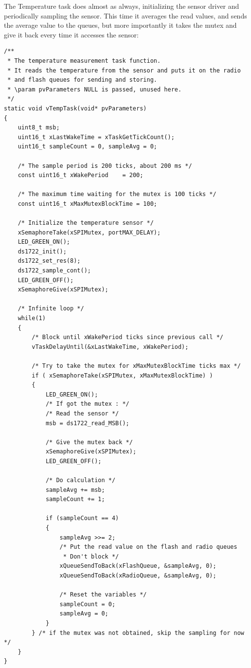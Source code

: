 \documentclass[11pt]{report}
\begin{document}
The Temperature task does almost as always, initializing the sensor driver and periodically sampling the sensor. This time it averages the read values, and sends the average value to the queues, but more importantly it takes the mutex and give it back every time it accesses the sensor:

\begin{verbatim}
/**
 * The temperature measurement task function.
 * It reads the temperature from the sensor and puts it on the radio
 * and flash queues for sending and storing.
 * \param pvParameters NULL is passed, unused here.
 */
static void vTempTask(void* pvParameters)
{
    uint8_t msb;
    uint16_t xLastWakeTime = xTaskGetTickCount();
    uint16_t sampleCount = 0, sampleAvg = 0;
    
    /* The sample period is 200 ticks, about 200 ms */
    const uint16_t xWakePeriod    = 200;
    
    /* The maximum time waiting for the mutex is 100 ticks */
    const uint16_t xMaxMutexBlockTime = 100;
    
    /* Initialize the temperature sensor */
    xSemaphoreTake(xSPIMutex, portMAX_DELAY);
    LED_GREEN_ON();
    ds1722_init();
    ds1722_set_res(8);
    ds1722_sample_cont();
    LED_GREEN_OFF();
    xSemaphoreGive(xSPIMutex);
    
    /* Infinite loop */
    while(1)
    {
        /* Block until xWakePeriod ticks since previous call */
        vTaskDelayUntil(&xLastWakeTime, xWakePeriod);
        
        /* Try to take the mutex for xMaxMutexBlockTime ticks max */
        if ( xSemaphoreTake(xSPIMutex, xMaxMutexBlockTime) )
        {
            LED_GREEN_ON();
            /* If got the mutex : */
            /* Read the sensor */
            msb = ds1722_read_MSB();
            
            /* Give the mutex back */
            xSemaphoreGive(xSPIMutex);
            LED_GREEN_OFF();
            
            /* Do calculation */
            sampleAvg += msb;
            sampleCount += 1;
            
            if (sampleCount == 4)
            {
                sampleAvg >>= 2;
                /* Put the read value on the flash and radio queues
                 * Don't block */
                xQueueSendToBack(xFlashQueue, &sampleAvg, 0);
                xQueueSendToBack(xRadioQueue, &sampleAvg, 0);
                
                /* Reset the variables */
                sampleCount = 0;
                sampleAvg = 0;
            }
        } /* if the mutex was not obtained, skip the sampling for now */
    }
}
\end{verbatim}
\end{document}
